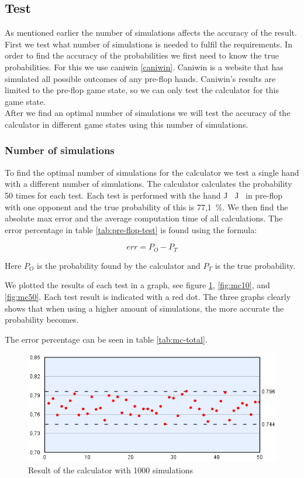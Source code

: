 \subsection{Test}
As mentioned earlier the number of simulations affects the accuracy of the result. First we test what number of simulations is needed to fulfil the requirements. 
In order to find the accuracy of the probabilities we first need to know the true probabilities. For this we use caniwin \ref{caniwin}. Caniwin is a website that has simulated all possible outcomes of any pre-flop hands. Caniwin's results are limited to the pre-flop game state, so we can only test the calculator for this game state.\\

After we find an optimal number of simulations we will test the accuracy of the calculator in different game states using this number of simulations.

\subsubsection{Number of simulations}
To find the optimal number of simulations for the calculator we test 
a single hand with a different number of simulations. The calculator calculates the probability 50 times for each test. Each test is performed with the hand J\clubsuit ~ J\diamondsuit ~ in pre-flop with one opponent and the true probability of this is 77,1~\%. We then find the absolute max error and the average computation time of all calculations. The error percentage in table \ref{tab:pre-flop-test} is found using the formula: 

\[err = P_{O} - P_{T}\]

Here $P_{O}$ is the probability found by the calculator and $P_{T} $ is the true probability. 

We plotted the results of each test in a graph, see figure \ref{fig:mc1}, \ref{fig:mc10}, and \ref{fig:mc50}. 
Each test result is indicated with a red dot. The three graphs clearly shows that when using a higher amount of simulations, the more accurate the probability becomes.

The error percentage can be seen in table \ref{tab:mc-total}.


\begin{figure}[H]
  \center
    \includegraphics[scale=0.775]{images/MonteCarlo/1k.png}
  \caption{Result of the calculator with 1000 simulations \label{fig:mc1}}
\end{figure}

